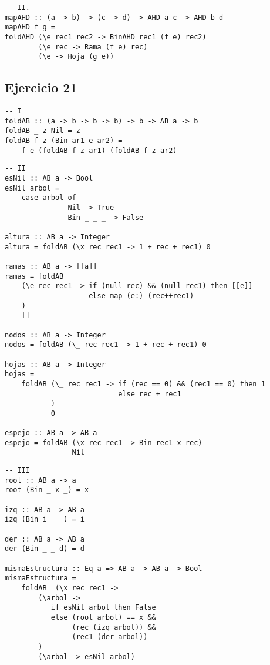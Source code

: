 \documentclass[10pt,a4paper]{article}
\begin{document}
\begin{centrado}
    \begin{verbatim}
-- II.
mapAHD :: (a -> b) -> (c -> d) -> AHD a c -> AHD b d
mapAHD f g = 
foldAHD (\e rec1 rec2 -> BinAHD rec1 (f e) rec2)
        (\e rec -> Rama (f e) rec)
        (\e -> Hoja (g e))
    \end{verbatim}
\end{centrado}

\subsection{Ejercicio 21}
\begin{centrado}
    \begin{verbatim}
-- I    
foldAB :: (a -> b -> b -> b) -> b -> AB a -> b
foldAB _ z Nil = z
foldAB f z (Bin ar1 e ar2) = 
    f e (foldAB f z ar1) (foldAB f z ar2)
    \end{verbatim}
\end{centrado}

\begin{centrado}
    \begin{verbatim}
-- II
esNil :: AB a -> Bool
esNil arbol = 
    case arbol of
               Nil -> True
               Bin _ _ _ -> False

altura :: AB a -> Integer
altura = foldAB (\x rec rec1 -> 1 + rec + rec1) 0

ramas :: AB a -> [[a]]
ramas = foldAB 
    (\e rec rec1 -> if (null rec) && (null rec1) then [[e]]
                    else map (e:) (rec++rec1)
    )
    []

nodos :: AB a -> Integer
nodos = foldAB (\_ rec rec1 -> 1 + rec + rec1) 0

hojas :: AB a -> Integer
hojas = 
    foldAB (\_ rec rec1 -> if (rec == 0) && (rec1 == 0) then 1
                           else rec + rec1
           )
           0

espejo :: AB a -> AB a
espejo = foldAB (\x rec rec1 -> Bin rec1 x rec)
                Nil
\end{verbatim}
\end{centrado}

\begin{centrado}
	\begin{verbatim}
-- III
root :: AB a -> a
root (Bin _ x _) = x

izq :: AB a -> AB a
izq (Bin i _ _) = i

der :: AB a -> AB a
der (Bin _ _ d) = d

mismaEstructura :: Eq a => AB a -> AB a -> Bool
mismaEstructura = 
    foldAB  (\x rec rec1 ->
        (\arbol ->
           if esNil arbol then False
           else (root arbol) == x && 
                (rec (izq arbol)) && 
                (rec1 (der arbol))
        )
        (\arbol -> esNil arbol)

	\end{verbatim}
\end{centrado}
\end{document}
